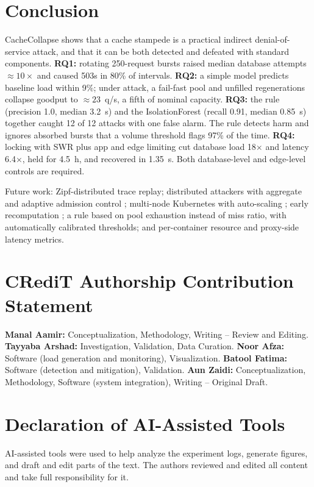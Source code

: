 \documentclass[journal]{IEEEtran}
\begin{document}
\section{Conclusion}
\label{sec:conclusion}
CacheCollapse shows that a cache stampede is a practical indirect denial-of-service
attack, and that it can be both detected and defeated with standard components.
\textbf{RQ1:} rotating 250-request bursts raised median database attempts ${\approx}10\times$
and caused 503s in 80\% of intervals. \textbf{RQ2:} a simple model predicts baseline load
within 9\%; under attack, a fail-fast pool and unfilled regenerations collapse goodput to
${\approx}23$~q/s, a fifth of nominal capacity. \textbf{RQ3:} the rule (precision 1.0,
median 3.2~s) and the IsolationForest (recall 0.91, median 0.85~s) together caught 12 of
12 attacks with one false alarm. The rule detects harm and ignores absorbed bursts that a
volume threshold flags 97\% of the time. \textbf{RQ4:} locking with SWR plus app and edge
limiting cut database load 18$\times$ and latency 6.4$\times$, held for 4.5~h, and
recovered in 1.35~s. Both database-level and edge-level controls are required.

Future work: Zipf-distributed trace replay; distributed attackers with aggregate and
adaptive admission control \cite{welsh2003,ranjan2009}; multi-node Kubernetes with
auto-scaling \cite{sides2016,bremlerbarr2017}; early recomputation \cite{vattani2015}; a
rule based on pool exhaustion instead of miss ratio, with automatically calibrated
thresholds; and per-container resource and proxy-side latency metrics.

\section*{CRediT Authorship Contribution Statement}
\textbf{Manal Aamir:} Conceptualization, Methodology, Writing -- Review and Editing.
\textbf{Tayyaba Arshad:} Investigation, Validation, Data Curation.
\textbf{Noor Afza:} Software (load generation and monitoring), Visualization.
\textbf{Batool Fatima:} Software (detection and mitigation), Validation.
\textbf{Aun Zaidi:} Conceptualization, Methodology, Software (system integration),
Writing -- Original Draft.

\section*{Declaration of AI-Assisted Tools}
AI-assisted tools were used to help analyze the experiment logs, generate figures, and
draft and edit parts of the text. The authors reviewed and edited all content and take
full responsibility for it.



\end{document}
